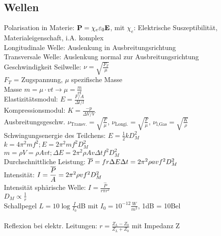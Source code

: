 \documentclass[fs, footer]{latex4ei}
\begin{document}
\begin{multicols*}{4}
\subsection{Wellen}
Polarisation in Materie: $\textbf{P} = \chi_e\varepsilon_0\textbf{E}$, mit $\chi_e$: Elektrische Suszeptibilität, Materialeigenschaft, i.A. komplex\\
Longitudinale Welle: Auslenkung in Ausbreitungsrichtung\\
Transversale Welle: Auslenkung normal zur Ausbreitungsrichtung\\
Geschwindigkeit Seilwelle: $\nu = \sqrt{\frac{F_T}{\mu}}$\\ 
$F_T$ = Zugspannung, $\mu$ spezifische Masse\\ %
Masse $m = \mu\cdot vt \rightarrow \mu = \frac{m}{vt}$\\
Elastizitätsmodul: $E = \frac{F / A}{\Delta l / l}$\\
Kompressionsmodul: $K = \frac{-p}{\Delta V / V}$\\
Ausbreitungsgeschw. $\nu_{\text{Transv.}} = \sqrt{\frac{F}{\mu}}$, $\nu_{\text{Longi.}} = \sqrt{\frac{F}{\mu}}$, $\nu_\text{l,Gas} = \sqrt{\frac{K}{\rho}}$\\ %
Schwingungsenergie des Teilchens: $E = \frac{1}{2}kD_M^2$\\
$k = 4\pi ^2mf^2; E = 2\pi^2mf^2D_M^2$\\
$m = \rho V = \rho A v t; \Delta E = 2\pi^2 \rho A v \Delta tf^2D_M^2$\\
Durchschnittliche Leistung: $\overline{P} = fr{\Delta E}{\Delta t} = 2\pi ^2 \rho a v f^2 D_M^2$\\
Intensität: $ I = \dfrac{\overline{P}}{A} = 2\pi^2\rho v f^2D_M^2$\\
Intensität sphärische Welle: $I = \frac{\hat{P}}{r\pi r^2}$\\
$D_M \propto \frac{1}{r}$\\
Schallpegel $L = 10\log{\frac{I}{I_0}}$dB mit $I_0 = 10^{-12}\frac{W}{m^2}$, 1dB = 10Bel\\
\\
Reflexion bei elektr. Leitungen: $ r = \frac{Z_L-Z_0}{Z_L+Z_0}$ mit Impedanz Z\\


\end{multicols*}
\end{document}
